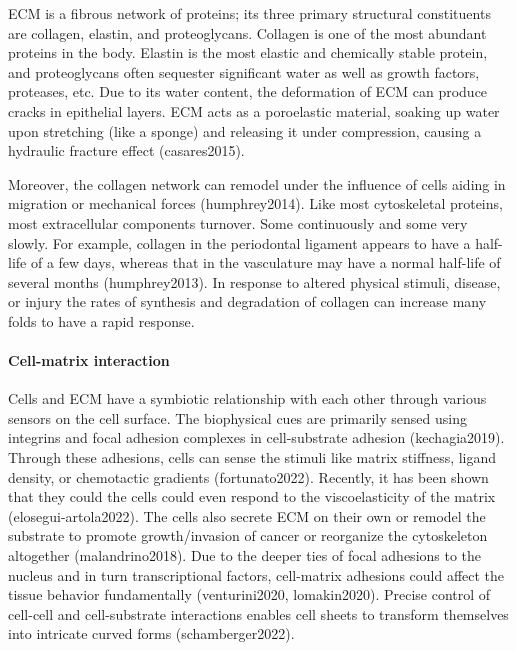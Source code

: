\documentclass[
]{article}
\begin{document}
ECM is a fibrous network of proteins; its three primary structural
constituents are collagen, elastin, and proteoglycans. Collagen is one
of the most abundant proteins in the body. Elastin is the most elastic
and chemically stable protein, and proteoglycans often sequester
significant water as well as growth factors, proteases, etc. Due to its
water content, the deformation of ECM can produce cracks in epithelial
layers. ECM acts as a poroelastic material, soaking up water upon
stretching (like a sponge) and releasing it under compression, causing a
hydraulic fracture effect (casares2015).

Moreover, the collagen network can remodel under the influence of cells
aiding in migration or mechanical forces (humphrey2014). Like most
cytoskeletal proteins, most extracellular components turnover. Some
continuously and some very slowly. For example, collagen in the
periodontal ligament appears to have a half-life of a few days, whereas
that in the vasculature may have a normal half-life of several months
(humphrey2013). In response to altered physical stimuli, disease, or
injury the rates of synthesis and degradation of collagen can increase
many folds to have a rapid response.

\hypertarget{cell-matrix-interaction}{%
\paragraph{Cell-matrix interaction}\label{cell-matrix-interaction}}

Cells and ECM have a symbiotic relationship with each other through
various sensors on the cell surface. The biophysical cues are primarily
sensed using integrins and focal adhesion complexes in cell-substrate
adhesion (kechagia2019). Through these adhesions, cells can sense the
stimuli like matrix stiffness, ligand density, or chemotactic gradients
(fortunato2022). Recently, it has been shown that they could the cells
could even respond to the viscoelasticity of the matrix
(elosegui-artola2022). The cells also secrete ECM on their own or
remodel the substrate to promote growth/invasion of cancer or reorganize
the cytoskeleton altogether (malandrino2018). Due to the deeper ties of
focal adhesions to the nucleus and in turn transcriptional factors,
cell-matrix adhesions could affect the tissue behavior fundamentally
(venturini2020, lomakin2020). Precise control of cell-cell and
cell-substrate interactions enables cell sheets to transform themselves
into intricate curved forms (schamberger2022).
\end{document}

